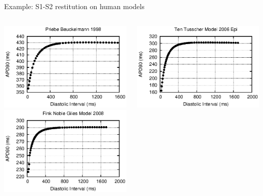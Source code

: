 \documentclass[t,xcolor={usenames,dvipsnames}]{beamer}
\begin{document}
\begin{frame}{Example: S1-S2 restitution on human models}
\begin{columns}[T]
\begin{column}{.33\linewidth}
\begin{center}
\includegraphics[width=\textwidth]{priebe_beuckelmann_1998_s1s2_curve}\\
\vspace{.1cm}
\includegraphics[width=\textwidth]{fink_noble_giles_model_2008_s1s2_curve}
\end{center}
\end{column}
\begin{column}{.33\linewidth}
\begin{center}
\includegraphics[width=\textwidth]{ten_tusscher_model_2006_epi_s1s2_curve}\\

\end{center}
\end{column}
\end{columns}
\end{frame}
\end{document}
